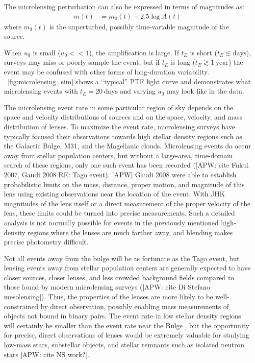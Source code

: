 \documentclass[12pt,preprint]{aastex}
\begin{document}
The microlensing perturbation can also be expressed in terms of magnitudes as:
\begin{align}
	m(t) &= m_0(t) - 2.5\log A(t)
\end{align}
where $m_0(t)$ is the unperturbed, possibly time-variable magnitude of the source.

When $u_0$ is small ($u_0<<1$), the amplification is large. If $t_E$ is short ($t_E \lesssim\mathrm{days}$), surveys may miss or poorly sample the event, but if $t_E$ is long ($t_E \gtrsim 1~\mathrm{year}$) the event may be confused with other forms of long-duration variability. \figurename~\ref{fig:microlensing_sim} shows a ``typical'' PTF light curve and demonstrates what microlensing events with $t_E=20~\mathrm{days}$ and varying $u_0$ may look like in the data.

The microlensing event rate in some particular region of sky depends on the space and velocity distributions of sources and on the space, velocity, and mass distribution of lenses. To maximize the event rate, microlensing surveys have typically focused their observations towards high stellar density regions such as the Galactic Bulge, M31, and the Magellanic clouds. Microlensing events do occur away from stellar population centers, but without a large-area, time-domain search of these regions, only one such event has been recorded ([APW: cite Fukui 2007, Gaudi 2008 RE: Tago event). [APW] Gaudi 2008 were able to establish probabilistic limits on the mass, distance, proper motion, and magnitude of this lens using existing observations near the location of the event. With JHK magnitudes of the lens itself or a direct measurement of the proper velocity of the lens, these limits could be turned into precise measurements. Such a detailed analysis is not normally possible for events in the previously mentioned high-density regions where the lenses are much farther away, and blending makes precise photometry difficult. 

Not all events away from the bulge will be as fortunate as the Tago event, but lensing events away from stellar population centers are generally expected to have closer sources, closer lenses, and less crowded background fields compared to  those found by modern microlensing surveys ([APW: cite Di Stefano mesolensing]). Thus, the properties of the lenses are more likely to be well-constrained by direct observation, possibly enabling mass measurements of objects not bound in binary pairs. The event rate in low stellar density regions will certainly be smaller than the event rate near the Bulge \citep[e.g.,][]{wood_optical_depth, ogle_optical_depth, macho_optical_depth, eros_optical_depth}, but the opportunity for precise, direct observations of lenses would be extremely valuable for studying low-mass stars, substellar objects, and stellar remnants such as isolated neutron stars [APW: cite NS work?]. 
\end{document}
